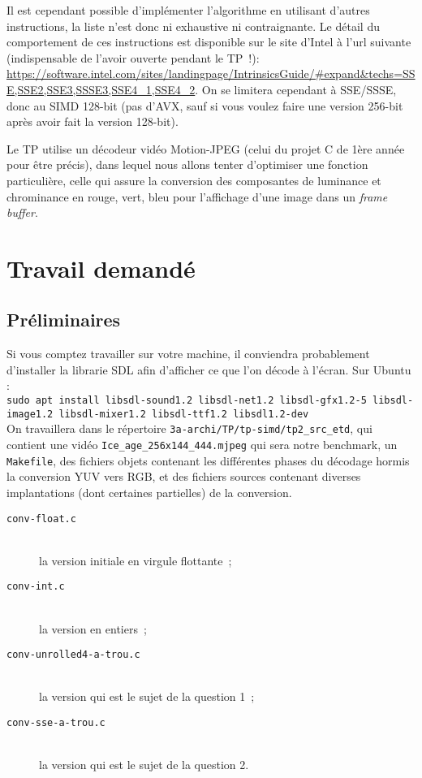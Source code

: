 \documentclass[a4paper,12pt]{article}
\begin{document}
\vspace{10pt}
Il est cependant possible d'implémenter l'algorithme en utilisant d'autres instructions, la liste n'est donc ni exhaustive ni contraignante. Le détail du comportement de ces instructions est disponible sur le site d'Intel à l'url suivante (indispensable de l'avoir ouverte pendant le TP~!):\\
{\footnotesize\ttfamily \url{https://software.intel.com/sites/landingpage/IntrinsicsGuide/#expand&techs=SSE,SSE2,SSE3,SSSE3,SSE4_1,SSE4_2}}. On se limitera cependant à SSE/SSSE, donc au SIMD 128-bit (pas d'AVX, sauf si vous voulez faire une version 256-bit après avoir fait la version 128-bit).

Le TP utilise un décodeur vidéo Motion-JPEG (celui du projet C de 1ère année pour être précis), dans lequel nous allons tenter d'optimiser une fonction particulière, celle qui assure la conversion des composantes de luminance et chrominance en rouge, vert, bleu pour l'affichage d'une image dans un \emph{frame buffer}.

\section{Travail demandé}

\subsection{Préliminaires}


Si vous comptez travailler sur votre machine, il conviendra probablement d'installer la librarie SDL afin d'afficher ce que l'on décode à l'écran. Sur Ubuntu : \\

\lstinline{sudo apt install libsdl-sound1.2 libsdl-net1.2 libsdl-gfx1.2-5 libsdl-image1.2 libsdl-mixer1.2 libsdl-ttf1.2 libsdl1.2-dev} \\


On travaillera dans le répertoire \lstinline{3a-archi/TP/tp-simd/tp2_src_etd}, qui contient une vidéo \lstinline{Ice_age_256x144_444.mjpeg} qui sera notre benchmark, un \lstinline{Makefile}, des fichiers objets contenant les différentes phases du décodage hormis la conversion YUV vers RGB, et des fichiers sources contenant diverses implantations (dont certaines partielles) de la conversion.
\begin{description}
\item[\texttt{conv-float.c}]~\\
     la version initiale en virgule flottante~;
\item[\texttt{conv-int.c}]~\\
     la version en entiers~;
\item[\texttt{conv-unrolled4-a-trou.c}]~\\
     la version qui est le sujet de la question 1~;
\item[\texttt{conv-sse-a-trou.c}]~\\
     la version qui est le sujet de la question 2.
\end{description}
\end{document}
